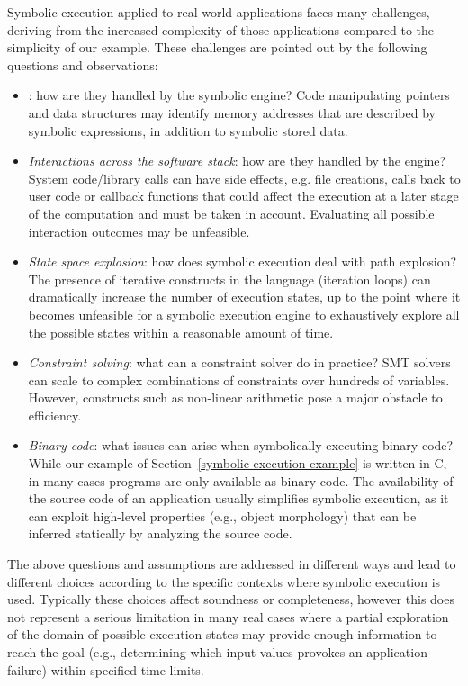 Symbolic execution applied to real world applications faces many challenges, deriving from the increased complexity of those applications compared to the simplicity of our example. These challenges are pointed out by the following questions and observations:

\begin{itemize}
	\item {}: how are they handled by the symbolic engine? Code manipulating pointers and data structures may identify memory addresses that are described by symbolic expressions, in addition to symbolic stored data.
	\item {\em Interactions across the software stack}: how are they handled by the engine? System code/library calls can have side effects, e.g. file creations, calls back to user code or callback functions that could affect the execution at a later stage of the computation and must be taken in account. 
	Evaluating all possible interaction outcomes may be unfeasible.
	\item {\em State space explosion}: how does symbolic execution deal with path explosion? The presence of iterative constructs in the language (iteration loops) can dramatically increase the number of execution states, up to the point where it becomes unfeasible for a symbolic execution engine to exhaustively explore all the possible states within a reasonable amount of time. 
	\item {\em Constraint solving}: what can a constraint solver do in practice?
	SMT solvers can scale to complex combinations of constraints over hundreds of variables. However, constructs such as non-linear arithmetic pose a major obstacle to efficiency.
	\item {\em Binary code}: what issues can arise when symbolically executing binary code?
	While our example of Section~\ref{symbolic-execution-example} is written in C, in many cases programs are only available as binary code. The availability of the source code of an application usually simplifies symbolic execution, as it can exploit high-level properties (e.g., object morphology) that can be inferred statically by analyzing the source code.
\end{itemize}

\noindent The above questions and assumptions are addressed in different ways and lead to different choices according to the specific contexts where symbolic execution is used. Typically these choices affect soundness or completeness, however this does not represent a serious limitation in many real cases where a partial exploration of the domain of possible execution states may provide enough information to reach the goal (e.g., determining which input values provokes an application failure) within specified time limits.

